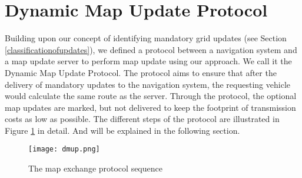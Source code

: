 \section{Dynamic Map Update Protocol}\label{protocol}
Building upon our concept of identifying mandatory grid updates (see Section \ref{classificationofupdates}), we defined a protocol between a navigation system and a map update server to perform map update using our approach. We call it the Dynamic Map Update Protocol. The protocol aims to ensure that after the delivery of mandatory updates to the navigation system, the requesting vehicle would calculate the same route as the server. Through the protocol, the optional map updates are marked, but not delivered to keep the footprint of transmission costs as low as possible. The different steps of the protocol are illustrated in Figure \ref{fg:protocol} in detail. And will be explained in the following section.


\begin{figure}
\centering
\texttt{[image: dmup.png]}
\caption{The map exchange protocol sequence}
\label{fg:protocol}
\end{figure}




